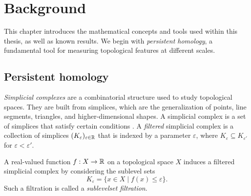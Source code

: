 \chapter{Background}

This chapter introduces the mathematical concepts and tools used within this
thesis, as well as known results. We begin with \emph{persistent homology}, a
fundamental tool for measuring topological features at different scales.

\section{Persistent homology}

\emph{Simplicial complexes} are a combinatorial structure used to study topological
spaces. They are built from simplices, which are the generalization of
points, line segments, triangles, and higher-dimensional shapes. A simplicial
complex is a set of simplices that satisfy certain conditions .
A \emph{filtered} simplicial complex is a collection of simplices
$(K_\varepsilon)_{\varepsilon \in \mathbb{R}}$ that is indexed by a parameter $\varepsilon$,
where $K_\varepsilon \subseteq K_{\varepsilon'}$ for $\varepsilon < \varepsilon'$.

A real-valued function $f: X \to \mathbb{R}$ on a topological space $X$ induces a
filtered simplicial complex by considering the sublevel sets
\[
    K_\varepsilon = \{ x \in X \mid f(x) \leq \varepsilon \}.
\]
Such a filtration is called a \emph{sublevelset filtration}.

